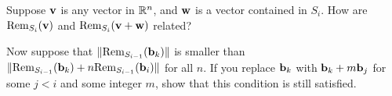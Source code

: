\begin{explor}
	Suppose $\mathbf{v}$ is any vector in $\mathbb{R}^n$, and $\mathbf{w}$ is a vector contained in $S_i$. How are $\text{Rem}_{S_i}(\mathbf{v})$ and $\text{Rem}_{S_i}(\mathbf{v}+\mathbf{w})$ related?
	
	Now suppose that $\|\text{Rem}_{S_{i-1}}(\mathbf{b}_k)\|$ is smaller than $\|\text{Rem}_{S_{i-1}}(\mathbf{b}_k)+n\text{Rem}_{S_{i-1}}(\mathbf{b}_i)\|$ for all $n$. If you replace $\mathbf{b}_k$ with $\mathbf{b}_k+m\mathbf{b}_j$ for some $j<i$ and some integer $m$, show that this condition is still satisfied.
\end{explor}









\begin{comment}

\begin{explor}
	To reduce $2$-D lattices, we needed to solve the following problem:
	\begin{itemize}
		\item Find $n$ such that $\v+n\u$ is as short as possible.
		\item Find $n$ such that the angle between $\u$ and $\v+n\u$ is as close to $90^\circ$ as possible.
	\end{itemize}
	Now suppose we try to solve a continuous version of this problem, with the integer $n$ replaced by any real number $r$. Describe the solution to this problem using $\text{Proj}$ and $\text{Rem}$.
\end{explor}




\begin{defn}
	Given vectors $\u=(u_1,\ldots,u_n)$ and $\v=(v_1,\ldots,v_n)$, their \textbf{dot product} is
	\[\u\cdot\v = u_1v_1+\cdots +u_nv_n.\]
	Note that $\u\cdot \u=\|\u\|^2$. The dot product is linear: $(\u+\v)\cdot \w=\u\cdot \w+\v\cdot \w$, and $(c\u)\cdot \v=c(\u\cdot \v)$ (and likewise for the second component).
\end{defn}


This gives us a way to automate $2$-D basis reduction even more; we can simply set $n$ to be the closest integer to $r$. Let's now generalize this result to higher dimensions. 

\begin{explor}
	Suppose the vectors $\u_1,\ldots,\u_k$ are all orthogonal to each other. The \textbf{projection of $\v$ onto the span of $\u_1,\ldots,\u_k$} is defined by
	\[\text{Proj}_{\{\u_1,\ldots,\u_k\}}(\v)=\frac{\v\cdot\u_1}{\u_1\cdot \u_1}\u_1+\cdots +\frac{\v\cdot\u_k}{\u_k\cdot \u_k}\u_k.\]
	Prove that $\v-\text{Proj}_{\{\u_1,\ldots,\u_k\}}(\v)$ is perpendicular to each of $\u_1,\ldots,\u_k$.
\end{explor}


\end{comment}
